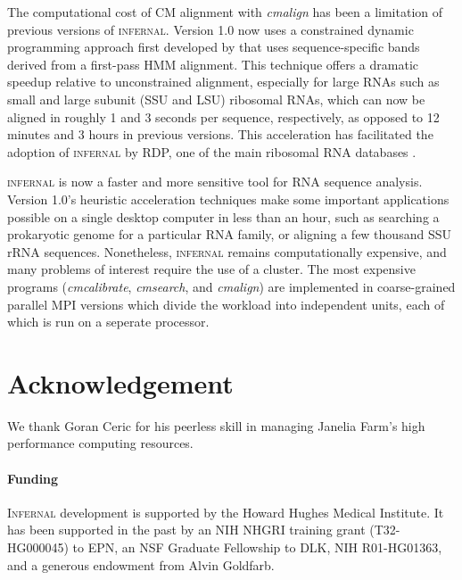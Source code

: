 \documentclass{bioinfo}
\begin{document}
\begin{application}
The computational cost of CM alignment with \emph{cmalign} has been a
limitation of previous versions of \textsc{infernal}. Version 1.0 now
uses a constrained dynamic programming approach first developed by
\citet{Brown00} that uses sequence-specific bands derived from a
first-pass HMM alignment. This technique offers a dramatic speedup
relative to unconstrained alignment, especially for large RNAs such as
small and large subunit (SSU and LSU) ribosomal RNAs, which can now be
aligned in roughly 1 and 3 seconds per sequence, respectively, as
opposed to 12 minutes and 3 hours in previous versions.  This
acceleration has facilitated the adoption of \textsc{infernal} by RDP,
one of the main ribosomal RNA databases \citep{Cole09}.

\textsc{infernal} is now a faster and more sensitive tool for RNA
sequence analysis.  Version 1.0's heuristic acceleration techniques
make some important applications possible on a single desktop computer
in less than an hour, such as searching a prokaryotic genome for a
particular RNA family, or aligning a few thousand SSU rRNA sequences.
Nonetheless, \textsc{infernal} remains computationally expensive, and many
problems of interest require the use of a cluster.  The most expensive
programs (\emph{cmcalibrate}, \emph{cmsearch}, and \emph{cmalign}) are
implemented in coarse-grained parallel MPI versions which divide the
workload into independent units, each of which is run on a seperate
processor. 


\section*{Acknowledgement}

We thank Goran Ceric for his peerless skill in managing Janelia Farm's
high performance computing resources.

\paragraph*{Funding\textcolon} 
\textsc{Infernal} development is supported by the Howard Hughes
Medical Institute. It has been supported in the past by an NIH NHGRI
training grant (T32-HG000045) to EPN, an NSF Graduate Fellowship to
DLK, NIH R01-HG01363, and a generous endowment from Alvin Goldfarb.


\begin{figure}[h]


\end{figure}
\end{application}
\end{document}
